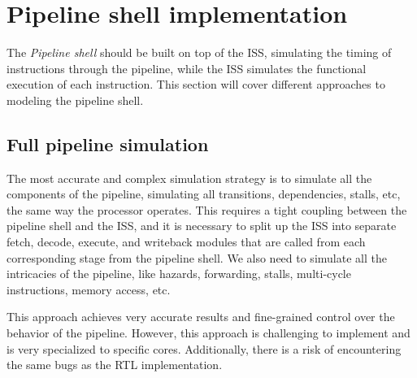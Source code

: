 \section{Pipeline shell implementation}
\label{sec:pipelineShell}

The \textit{Pipeline shell} should be built on top of the ISS, simulating the timing of instructions through the pipeline, while the ISS simulates the functional execution of each instruction. This section will cover different approaches to modeling the pipeline shell.



\subsection{Full pipeline simulation}
\label{sec:fullPipeline}

The most accurate and complex simulation strategy is to simulate all the components of the pipeline, simulating all transitions, dependencies, stalls, etc, the same way the processor operates. This requires a tight coupling between the pipeline shell and the ISS, and it is necessary to split up the ISS into separate fetch, decode, execute, and writeback modules that are called from each corresponding stage from the pipeline shell. We also need to simulate all the intricacies of the pipeline, like hazards, forwarding, stalls, multi-cycle instructions, memory access, etc. 

This approach achieves very accurate results and fine-grained control over the behavior of the pipeline. However, this approach is challenging to implement and is very specialized to specific cores. Additionally, there is a risk of encountering the same bugs as the RTL implementation.

